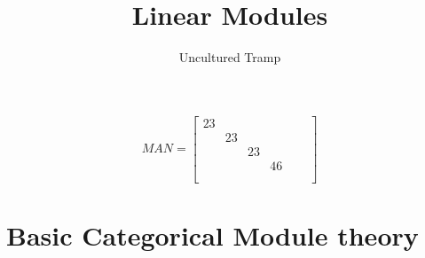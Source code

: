 \documentclass[12pt]{scrartcl}
\title{Linear Modules}
\author{Uncultured Tramp}
\renewcommand{\.}{\; . \;}
\begin{document}
\maketitle
\Huge
{}
\vspace*{\fill}
$$
MAN = \left[
\begin{array}{ccccc}
23& &  &  &   \\
 &23&  &  &   \\
 & &23&  &   \\
 & &  &46&   \\
 & &  &  & \quad \\
\end{array}
\right]
$$
\vspace*{\fill}
\normalsize
\newpage
\tableofcontents
\newpage
\section{Basic Categorical Module theory}
\end{document}
